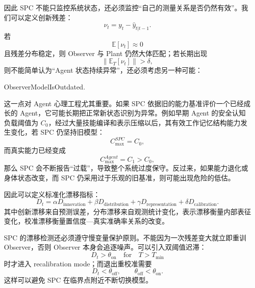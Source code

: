 因此 SPC 不能只监控系统状态，还必须监控“自己的测量关系是否仍然有效”。我们可以定义创新残差：
\begin{equation}
\nu_t
=
y_t-\hat y_{t|t-1}.
\end{equation}
若
\begin{equation}
\mathbb E[\nu_t]
\approx 0
\end{equation}
且残差分布稳定，则 Observer 与 Plant 仍然大体匹配；若长期出现
\begin{equation}
\|\mathbb E_T[\nu_t]\|
>
\delta,
\end{equation}
则不能简单认为“Agent 状态持续异常”，还必须考虑另一种可能：
\begin{statementbox}
ObserverModelIsOutdated.
\end{statementbox}

这一点对 Agent 心理工程尤其重要。如果 SPC 依据旧的能力基准评价一个已经成长的 Agent，它可能长期把正常新状态识别为异常。例如早期 Agent 的安全认知负载阈值为 $C_0$，经过大量技能编译和表示压缩以后，其有效工作记忆结构能力发生变化，若 SPC 仍坚持旧模型：
\begin{equation}
C_{\max}^{SPC}
=
C_0,
\end{equation}
而真实能力已经变成
\begin{equation}
C_{\max}^{Agent}
=
C_1>C_0,
\end{equation}
那么 SPC 会不断报告“过载”，导致整个系统过度保守。反过来，如果能力退化或身体状态改变，而 SPC 仍采用过于乐观的旧基准，则可能出现危险的低估。

因此可以定义标准化漂移指标：
\begin{equation}
D_t
=
\alpha D_{\mathrm{innovation}}
+
\beta D_{\mathrm{distribution}}
+
\gamma D_{\mathrm{representation}}
+
\delta D_{\mathrm{calibration}}.
\end{equation}
其中创新漂移来自预测误差，分布漂移来自观测统计变化，表示漂移衡量内部表征变化，校准漂移衡量置信度—真实准确率关系的改变。

SPC 的漂移检测还必须遵守慢变量保护原则。不能因为一次残差变大就立即重训 Observer，否则 Observer 本身会追逐噪声。可以引入双阈值迟滞：
\begin{equation}
D_t>\theta_{\mathrm{on}}
\quad
\mathrm{for}\quad
T>T_{\min}
\end{equation}
时才进入 recalibration mode；而退出重校准需要
\begin{equation}
D_t<\theta_{\mathrm{off}},
\qquad
\theta_{\mathrm{off}}<\theta_{\mathrm{on}}.
\end{equation}
这样可以避免 SPC 在临界点附近不断切换模型。

